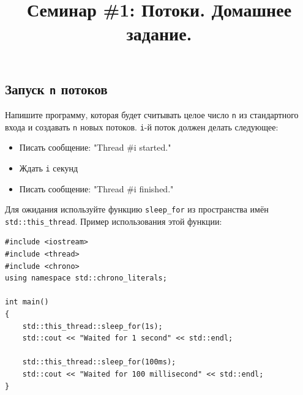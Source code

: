 \documentclass{article}
\begin{document}
\title{Семинар \#1: Потоки. Домашнее задание.\vspace{-5ex}}\date{}\maketitle

\subsection{Запуск \texttt{n} потоков}
Напишите программу, которая будет считывать целое число \texttt{n} из стандартного входа и создавать \texttt{n} новых потоков. \texttt{i}-й поток должен делать следующее:
\begin{itemize}
\item Писать сообщение: "Thread \#i started."
\item Ждать \texttt{i} секунд
\item Писать сообщение: "Thread \#i finished."
\end{itemize}

Для ожидания используйте функцию \texttt{sleep\_for} из пространства имён \texttt{std::this\_thread}. Пример использования этой функции:
\begin{lstlisting}
#include <iostream>
#include <thread>
#include <chrono>
using namespace std::chrono_literals;

int main()
{
    std::this_thread::sleep_for(1s);
    std::cout << "Waited for 1 second" << std::endl;
    
    std::this_thread::sleep_for(100ms);
    std::cout << "Waited for 100 millisecond" << std::endl;
}
\end{lstlisting}
\end{document}
